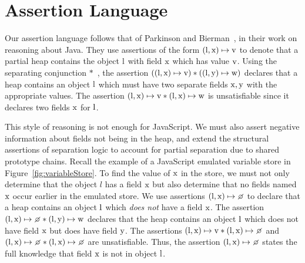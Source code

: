 \documentclass{article}
\begin{document}
\section{Assertion Language}\label{sec:assertionLanguage}
%
Our assertion language follows that of Parkinson and Bierman~\cite{Parkinson05,ParkinsonB08,Bierman03mj:an}, in their work on     reasoning about Java.
They use  assertions of the form $({\mathrm{l}}, {\mathrm{x}}) \mapsto {\ensuremath{\mathrm{v}}}$ to denote  that a partial heap contains the object ${\mathrm{l}}$ with field $ {\mathrm{x}}$ which has value ${\mathrm{v}}$. Using the separating conjunction $\ast$~\cite{DBLP:conf/csl/OHearnRY01},  the assertion $(({\mathrm{l}}, {\mathrm{x}}) \mapsto {\ensuremath{\mathrm{v}}} ) \ast (({\mathrm{l}}, {\mathrm{y}}) \mapsto {\ensuremath{\mathrm{w}}})$ declares  that a heap contains an object ${\mathrm{l}}$ which must have two separate fields ${\mathrm{x}}, {\mathrm{y}}$ with the appropriate values. The assertion
$({\mathrm{l}}, {\mathrm{x}}) \mapsto {\ensuremath{\mathrm{v}}} \ast ({\mathrm{l}}, {\mathrm{x}}) \mapsto {\ensuremath{\mathrm{w}}}$ is unsatisfiable since it declares two fields ${\mathrm{x}}$ for ${\mathrm{l}}$. 

This style of reasoning  is not enough for  JavaScript.
We must also assert negative information about fields not being in the heap,  and  extend 
the  structural assertions of separation logic to account for partial separation due to shared prototype chains. 
Recall the example of a JavaScript emulated variable store in Figure~\ref{fig:variableStore}. 
To find the value of ${\mathrm{x}}$ in the store, we must not only determine that the object $l$ has a field  ${\mathrm{x}}$ 
but also determine that no fields named ${\mathrm{x}}$ occur earlier in the emulated store. 
We use  assertions 
$(\V{l}, \V{x}) \mapsto \none$ to declare  that a {heap}  contains an object ${\mathrm{l}}$  which {\em does not} have a field ${\mathrm{x}}$. 
The assertion  $(\V{l}, \V{x}) \mapsto \none \ast (\V{l}, \V{y}) \mapsto \V{w}$ declares  that the heap contains an object ${\mathrm{l}}$  which { does not} have field ${\mathrm{x}}$  but does have field $ {\mathrm{y}}$. The assertions  $(\V{l}, \V{x}) \mapsto \V{v} \ast (\V{l}, \V{x}) \mapsto \none$ and
$(\V{l}, \V{x}) \mapsto \none \ast (\V{l}, \V{x}) \mapsto \none$ are unsatisfiable. Thus, the assertion $(\V{l}, \V{x}) \mapsto \none$
states the full knowledge that field ${\mathrm{x}}$  is not in object ${\mathrm{l}}$. 
\end{document}
